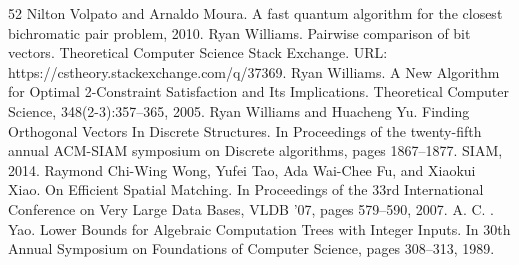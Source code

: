 \documentclass[10pt,a4paper]{article}
\begin{document}
\begin{thebibliography}{52}
 Nilton Volpato and Arnaldo Moura. A fast quantum algorithm for the closest bichromatic pair problem, 2010.
 Ryan Williams. Pairwise comparison of bit vectors. Theoretical Computer Science Stack Exchange. URL: https://cstheory.stackexchange.com/q/37369.
 Ryan Williams. A New Algorithm for Optimal 2-Constraint Satisfaction and Its Implications. Theoretical Computer Science, 348(2-3):357–365, 2005.
 Ryan Williams and Huacheng Yu. Finding Orthogonal Vectors In Discrete Structures. In Proceedings of the twenty-fifth annual ACM-SIAM symposium on Discrete algorithms, pages 1867–1877. SIAM, 2014.
 Raymond Chi-Wing Wong, Yufei Tao, Ada Wai-Chee Fu, and Xiaokui Xiao. On Efficient Spatial Matching. In Proceedings of the 33rd International Conference on Very Large Data Bases, VLDB ’07, pages 579–590, 2007.
 A. C. . Yao. Lower Bounds for Algebraic Computation Trees with Integer Inputs. In 30th Annual Symposium on Foundations of Computer Science, pages 308–313, 1989.
\end{thebibliography}
\end{document}
